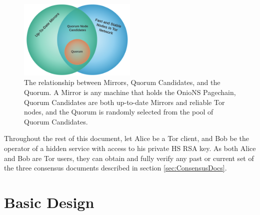 \begin{figure}[htbp]
	\centering
	\includegraphics[width=0.5\textwidth]{images/LucidCharts/Participants.pdf}
	\caption{The relationship between Mirrors, Quorum Candidates, and the Quorum. A Mirror is any machine that holds the OnioNS Pagechain, Quorum Candidates are both up-to-date Mirrors and reliable Tor nodes, and the Quorum is randomly selected from the pool of Quorum Candidates.}
\end{figure}

Throughout the rest of this document, let Alice be a Tor client, and Bob be the operator of a hidden service with access to his private HS RSA key. As both Alice and Bob are Tor users, they can obtain and fully verify any past or current set of the three consensus documents described in section \ref{sec:ConsensusDocs}.

\section{Basic Design}
\label{sec:BasicDesign}

